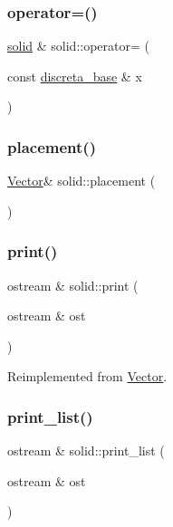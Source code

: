 \subsubsection{\texorpdfstring{operator=()}{operator=()}}
{\footnotesize\ttfamily \mbox{\hyperlink{classsolid}{solid}} \& solid\+::operator= (\begin{DoxyParamCaption}\item[{const \mbox{\hyperlink{classdiscreta__base}{discreta\+\_\+base}} \&}]{x }\end{DoxyParamCaption})}

\mbox{\label{classsolid_ac06c1e06d6dc5c6f43b1c850892548c8}} 
\subsubsection{\texorpdfstring{placement()}{placement()}}
{\footnotesize\ttfamily \mbox{\hyperlink{class_vector}{Vector}}\& solid\+::placement (\begin{DoxyParamCaption}{ }\end{DoxyParamCaption})\hspace{0.3cm}{\ttfamily [inline]}}

\mbox{\label{classsolid_a0afe4403778d31d092e2a66c13a9a365}} 
\subsubsection{\texorpdfstring{print()}{print()}}
{\footnotesize\ttfamily ostream \& solid\+::print (\begin{DoxyParamCaption}\item[{ostream \&}]{ost }\end{DoxyParamCaption})\hspace{0.3cm}{\ttfamily [virtual]}}



Reimplemented from \mbox{\hyperlink{class_vector_a71d7e24bcfdfc69d4a2137360acb066c}{Vector}}.

\mbox{\label{classsolid_a2a8cb93b481e1876260e7b8739cf4695}} 
\subsubsection{\texorpdfstring{print\+\_\+list()}{print\_list()}}
{\footnotesize\ttfamily ostream \& solid\+::print\+\_\+list (\begin{DoxyParamCaption}\item[{ostream \&}]{ost }\end{DoxyParamCaption})}

